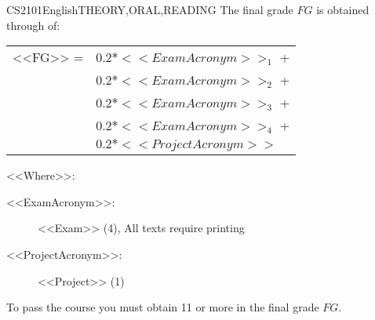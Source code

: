   \begin{evaluation}{CS2101}{English}{THEORY,ORAL,READING}
  The final grade $FG$ is obtained through of:
 
  \begin{tabular}{cl}
      <<FG>> = & $0.2* <<ExamAcronym>>_{1}$ + \\
               & $0.2* <<ExamAcronym>>_{2}$ + \\
               & $0.2* <<ExamAcronym>>_{3}$ + \\
               & $0.2* <<ExamAcronym>>_{4}$ + \\
               & $0.2*<<ProjectAcronym>>$ \\
  \end{tabular}

    \noindent <<Where>>:
  \begin{description}
      \item[<<ExamAcronym>>:] <<Exam>> (4), All texts require printing
      \item[<<ProjectAcronym>>:] <<Project>> (1)
  \end{description}
  \noindent To pass the course you must obtain 11 or more in the final grade $FG$.
  \end{evaluation}


